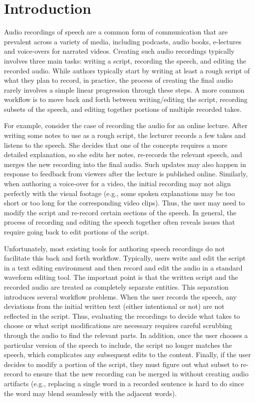 \section{Introduction}

Audio recordings of speech are a common form of communication that are prevalent across a variety of media, including podcasts, audio books, e-lectures and voice-overs for narrated videos.
%
Creating such audio recordings typically involves three main tasks: writing a script, recording the speech, and editing the recorded audio. 
%
While authors typically start by writing at least a rough script of what they plan to record, in practice, the process of creating the final audio rarely involves a simple linear progression through these steps. A more common workflow is to move back and forth between writing/editing the script, recording subsets of the speech, and editing together portions of multiple recorded takes.

For example, consider the case of recording the audio for an online lecture. After writing some notes to use as a rough script, the lecturer records a few takes and listens to the speech. She decides that one of the concepts requires a more detailed explanation, so she edits her notes, re-records the relevant speech, and merges the new recording into the final audio. Such updates may also happen in response to feedback from viewers after the lecture is published online. Similarly, when authoring a voice-over for a video, the initial recording may not align perfectly with the visual footage (e.g., some spoken explanations may be too short or too long for the corresponding video clips). Thus, the user may need to modify the script and re-record certain sections of the speech. In general, the process of recording and editing the speech together often reveals issues that require going back to edit portions of the script.

Unfortunately, most existing tools for authoring speech recordings do not facilitate this back and forth workflow. Typically, users write and edit the script in a text editing environment and then record and edit the audio in a standard waveform editing tool. The important point is that the written script and the recorded audio are treated as completely separate entities.
%
This separation introduces several workflow problems. When the user records the speech, any deviations from the initial written text (either intentional or not) are not reflected in the script. Thus, evaluating the recordings to decide what takes to choose or what script modifications are necessary requires careful scrubbing through the audio to find the relevant parts. In addition, once the user chooses a particular version of the speech to include, the script no longer matches the speech, which complicates any subsequent edits to the content. Finally, if the user decides to modify a portion of the script, they must figure out what subset to re-record to ensure that the new recording can be merged in without creating audio artifacts (e.g., replacing a single word in a recorded sentence is hard to do since the word may blend seamlessly with the adjacent words).


